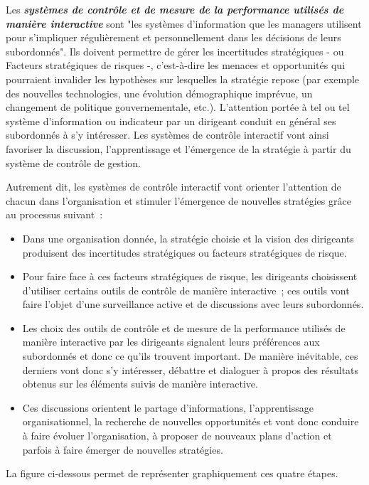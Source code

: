 \documentclass[oneside]{kaobook}
\begin{document}
Les \emph{\textbf{systèmes de contrôle et de mesure de la performance utilisés de manière interactive}} sont "les systèmes d'information que les managers utilisent pour s'impliquer régulièrement et personnellement dans les décisions de leurs subordonnés". Ils doivent permettre de gérer les incertitudes stratégiques - ou Facteurs stratégiques de risques -, c'est-à-dire les menaces et opportunités qui pourraient invalider les hypothèses sur lesquelles la stratégie repose (par exemple des nouvelles technologies, une évolution démographique imprévue, un changement de politique gouvernementale, etc.). L'attention portée à tel ou tel système d'information ou indicateur par un dirigeant conduit en général ses subordonnés à s'y intéresser. Les systèmes de contrôle interactif vont ainsi favoriser la discussion, l'apprentissage et l'émergence de la stratégie à partir du système de contrôle de gestion. 

Autrement dit, les systèmes de contrôle interactif vont orienter l'attention de chacun dans l'organisation et stimuler l'émergence de nouvelles stratégies grâce au processus suivant :
\begin{itemize}
\item Dans une organisation donnée, la stratégie choisie et la vision des dirigeants produisent des incertitudes stratégiques ou facteurs stratégiques de risque.
\item Pour faire face à ces facteurs stratégiques de risque, les dirigeants choisissent d'utiliser certains outils de contrôle de manière interactive ; ces outils vont faire l'objet d'une surveillance active et de discussions avec leurs subordonnés.
\item Les choix des outils de contrôle et de mesure de la performance utilisés de manière interactive par les dirigeants signalent leurs préférences aux subordonnés et donc ce qu'ils trouvent important. De manière inévitable, ces derniers vont donc s'y intéresser, débattre et dialoguer à propos des résultats obtenus sur les éléments suivis de manière interactive.
\item Ces discussions orientent le partage d'informations, l'apprentissage organisationnel, la recherche de nouvelles opportunités et vont donc conduire à faire évoluer l'organisation, à proposer de nouveaux plans d'action et parfois à faire émerger de nouvelles stratégies.
\end{itemize}
La figure ci-dessous permet de représenter graphiquement ces quatre étapes.
\end{document}
